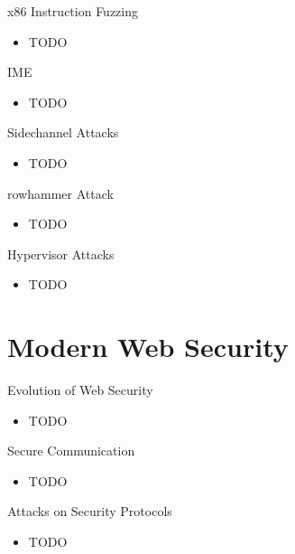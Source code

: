 \documentclass{curs}
\begin{document}
\begin{frame}{x86 Instruction Fuzzing}
  \begin{itemize}
    \item TODO
  \end{itemize}
\end{frame}

\begin{frame}{IME}
  \begin{itemize}
    \item TODO
  \end{itemize}
\end{frame}

\begin{frame}{Sidechannel Attacks}
  \begin{itemize}
    \item TODO
  \end{itemize}
\end{frame}

\begin{frame}{rowhammer Attack}
  \begin{itemize}
    \item TODO
  \end{itemize}
\end{frame}

\begin{frame}{Hypervisor Attacks}
  \begin{itemize}
    \item TODO
  \end{itemize}
\end{frame}

\section{Modern Web Security}

\begin{frame}{Evolution of Web Security}
  \begin{itemize}
    \item TODO
  \end{itemize}
\end{frame}

\begin{frame}{Secure Communication}
  \begin{itemize}
    \item TODO
  \end{itemize}
\end{frame}

\begin{frame}{Attacks on Security Protocols}
  \begin{itemize}
    \item TODO
  \end{itemize}
\end{frame}
\end{document}
